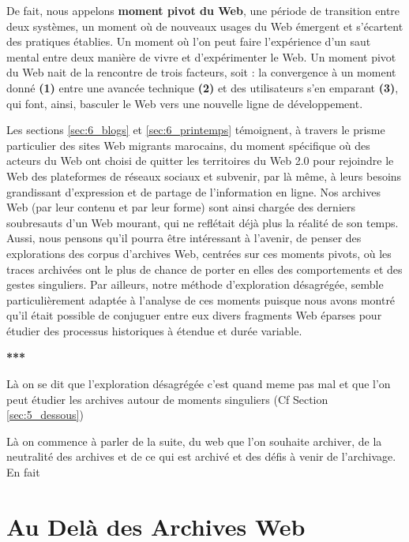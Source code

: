 \documentclass[symmetric,justified,marginals=raggedouter]{tufte-book}
\begin{document}
De fait, nous appelons \textbf{moment pivot du Web}, une période de transition entre deux systèmes, un moment où de nouveaux usages du Web émergent et s'écartent des pratiques établies. Un moment où l'on peut faire l'expérience d'un saut mental entre deux manière de vivre et d'expérimenter le Web. Un moment pivot du Web nait de la rencontre de trois facteurs, soit : la convergence à un moment donné \textbf{(1)} entre une avancée technique \textbf{(2)} et des utilisateurs s'en emparant \textbf{(3)}, qui font, ainsi, basculer le Web vers une nouvelle ligne de développement.

Les sections \ref{sec:6_blogs} et \ref{sec:6_printemps} témoignent, à travers le prisme particulier des sites Web migrants marocains, du moment spécifique où des acteurs du Web ont choisi de quitter les territoires du Web 2.0 pour rejoindre le Web des plateformes de réseaux sociaux et subvenir, par là même, à leurs  besoins grandissant d'expression et de partage de l'information en ligne. Nos archives Web (par leur contenu et par leur forme) sont ainsi chargée des derniers soubresauts d'un Web mourant, qui ne reflétait déjà plus la réalité de son temps. Aussi, nous pensons qu'il pourra être intéressant à l'avenir, de penser des explorations des corpus d'archives Web, centrées sur ces moments pivots, où les traces archivées ont le plus de chance de porter en elles des comportements et des gestes singuliers. Par ailleurs, notre méthode d'exploration désagrégée, semble particulièrement adaptée à l'analyse de ces moments puisque nous avons montré qu'il était possible de conjuguer entre eux divers fragments Web éparses pour étudier des processus historiques à étendue et durée variable.

\begin{center}
	\textbf{***}
\end{center}

\noindent Là on se dit que l'exploration désagrégée c'est quand meme pas mal et que l'on peut étudier les archives autour de moments singuliers (Cf Section \ref{sec:5_dessous})

\noindent Là on commence à parler de la suite, du web que l'on souhaite archiver, de la neutralité des archives et de ce qui est archivé et des défis à venir de l'archivage. En fait 


\chapter{Au Delà des Archives Web}
\label{chap:7}
\end{document}
